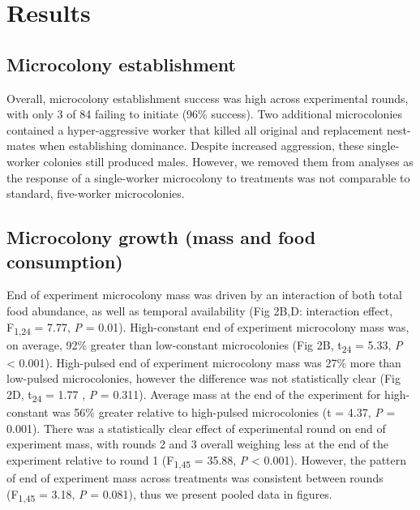 \documentclass[11pt,]{article}
\begin{document}
\hypertarget{results}{%
\section{Results}\label{results}}

\hypertarget{microcolony-establishment}{%
\subsection{Microcolony establishment}\label{microcolony-establishment}}

Overall, microcolony establishment success was high across experimental
rounds, with only 3 of 84 failing to initiate (96\% success). Two
additional microcolonies contained a hyper-aggressive worker that killed
all original and replacement nest-mates when establishing dominance.
Despite increased aggression, these single-worker colonies still
produced males. However, we removed them from analyses as the response
of a single-worker microcolony to treatments was not comparable to
standard, five-worker microcolonies.

\hypertarget{microcolony-growth-mass-and-food-consumption}{%
\subsection{Microcolony growth (mass and food
consumption)}\label{microcolony-growth-mass-and-food-consumption}}

End of experiment microcolony mass was driven by an interaction of both
total food abundance, as well as temporal availability (Fig 2B,D:
interaction effect, F\textsubscript{1,24} = 7.77, \emph{P} = 0.01).
High-constant end of experiment microcolony mass was, on average, 92\%
greater than low-constant microcolonies (Fig 2B, t\textsubscript{24} =
5.33, \emph{P} \textless{} 0.001). High-pulsed end of experiment
microcolony mass was 27\% more than low-pulsed microcolonies, however
the difference was not statistically clear (Fig 2D, t\textsubscript{24}
= 1.77 , \emph{P} = 0.311). Average mass at the end of the experiment
for high-constant was 56\% greater relative to high-pulsed microcolonies
(t = 4.37, \emph{P} = 0.001). There was a statistically clear effect of
experimental round on end of experiment mass, with rounds 2 and 3
overall weighing less at the end of the experiment relative to round 1
(F\textsubscript{1,45} = 35.88, \emph{P} \textless{} 0.001). However,
the pattern of end of experiment mass across treatments was consistent
between rounds (F\textsubscript{1,45} = 3.18, \emph{P} = 0.081), thus we
present pooled data in figures.
\end{document}
